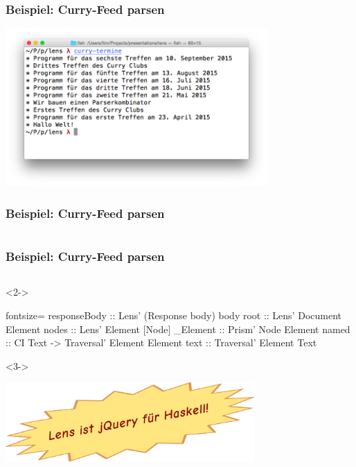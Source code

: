 \documentclass{beamer}
\begin{document}

\begin{frame}
  \frametitle{Beispiel: Curry-Feed parsen}
  \begin{center}
    \includegraphics[width=10cm]{images/curry-termine-screenshot.png}
  \end{center}
\end{frame}

\begin{frame}
  \frametitle{Beispiel: Curry-Feed parsen}
  \inputminted[fontsize=\footnotesize]{xml}{curry-feed.xml}
\end{frame}

{
\begin{frame}[fragile,b]
  \frametitle{Beispiel: Curry-Feed parsen}
  \inputminted[fontsize=\small]{haskell}{curry-termine/Main.hs}
  \begin{visibleenv}<2->
    \vspace{-7cm}
    \hfill \begin{minipage}{0.55 \linewidth}
      \begin{mdframed}[backgroundcolor=yellow]
\begin{haskellcode*}{fontsize=\footnotesize}
responseBody
  :: Lens' (Response body) body
root :: Lens' Document Element
nodes :: Lens' Element [Node]
_Element :: Prism' Node Element
named :: CI Text
      -> Traversal' Element Element
text :: Traversal' Element Text
\end{haskellcode*}
      \end{mdframed}
    \end{minipage}
  \end{visibleenv}
  \begin{visibleenv}<3->
    \vspace{-2cm}
    \begin{center}
      \includegraphics[height=3cm]{images/lens-jquery.png}
    \end{center}
    \vspace{8cm}
  \end{visibleenv}
\end{frame}
}
\end{document}
